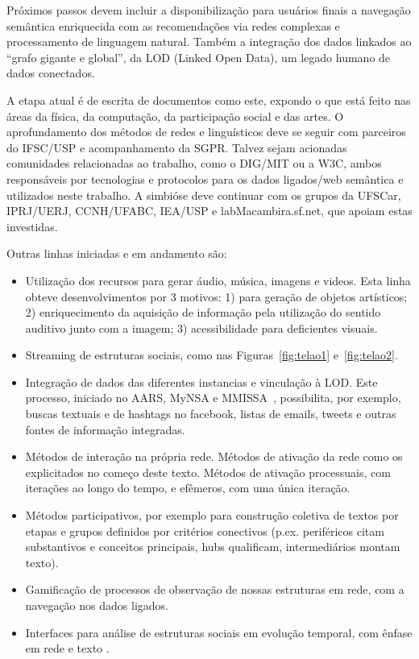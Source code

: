 \documentclass[a4paper, 11pt]{article} %
\begin{document}
Próximos passos devem incluir a disponibilização para usuários finais a navegação semântica enriquecida com as recomendações via redes complexas e processamento de linguagem natural. Também a integração dos dados linkados ao ``grafo gigante e global'', da LOD (Linked Open Data), um legado humano de dados conectados.

A etapa atual é de escrita de documentos como este, expondo o que está feito nas áreas da física, da computação, da participação social e das artes. O aprofundamento dos métodos de redes e linguísticos deve se seguir com parceiros do IFSC/USP e acompanhamento da SGPR. Talvez sejam acionadas comunidades relacionadas ao trabalho, como o DIG/MIT ou a W3C, ambos responsáveis por tecnologias e protocolos para os dados ligados/web semântica e utilizados neste trabalho. A simbióse deve continuar com os grupos da UFSCar, IPRJ/UERJ, CCNH/UFABC, IEA/USP e labMacambira.sf.net, que apoiam estas investidas.

Outras linhas iniciadas e em andamento são:
\begin{itemize}
\item Utilização dos recursos para gerar áudio, música, imagens e videos. Esta linha obteve desenvolvimentos por 3 motivos: 1) para geração de objetos artísticos; 2) enriquecimento da aquisição de informação pela utilização do sentido auditivo junto com a imagem; 3) acessibilidade para deficientes visuais.
\item Streaming de estruturas sociais, como nas Figuras~\ref{fig:telao1} e~\ref{fig:telao2}.
\item Integração de dados das diferentes instancias e vinculação à LOD. Este processo, iniciado no AARS, MyNSA e MMISSA~\cite{mynsa,mmissa}, possibilita, por exemplo, buscas textuais e de hashtags no facebook, listas de emails, tweets e outras fontes de informação integradas.
\item Métodos de interação na própria rede. Métodos de ativação da rede como os explicitados no começo deste texto. Métodos de ativação processuais, com iterações ao longo do tempo, e efêmeros, com uma única iteração.
\item Métodos participativos, por exemplo para construção coletiva de textos por etapas e grupos definidos por critérios conectivos (p.ex. periféricos citam substantivos e conceitos principais, hubs qualificam, intermediários montam texto).
\item Gamificação de processos de observação de nossas estruturas em rede, com a navegação nos dados ligados.
\item Interfaces para análise de estruturas sociais em evolução temporal, com ênfase em rede e texto .
\end{itemize}
\end{document}
